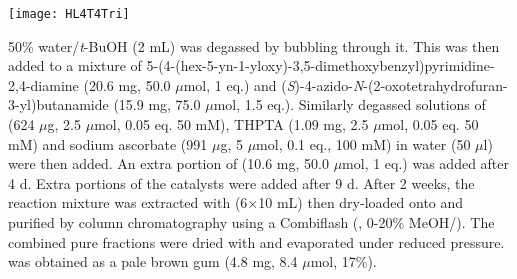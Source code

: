	
\begin{scheme}[H]
	\begin{center}
		\texttt{[image: HL4T4Tri]}
	\end{center}
\end{scheme}
50\% water/\textit{t}-BuOH (2 mL) was degassed by bubbling  through it. This was then added to a mixture of 5-(4-(hex-5-yn-1-yloxy)-3,5-dimethoxybenzyl)pyrimidine-2,4-diamine  (20.6 mg, 50.0 $\mu$mol, 1 eq.) and (\textit{S})-4-azido-\textit{N}-(2-oxotetrahydrofuran-3-yl)butanamide  (15.9 mg, 75.0 $\mu$mol, 1.5 eq.).
Similarly degassed solutions of  (624 $\mu$g, 2.5 $\mu$mol, 0.05 eq. 50 mM), THPTA (1.09 mg, 2.5 $\mu$mol, 0.05 eq. 50 mM) and sodium ascorbate (991 $\mu$g, 5 $\mu$mol, 0.1 eq., 100 mM) in water (50 $\mu$l) were then added. An extra portion of  (10.6 mg, 50.0 $\mu$mol, 1 eq.) was added after 4 d. Extra portions of the catalysts were added after 9 d. 
After 2 weeks, the reaction mixture was extracted with  (6$\times$10 mL) then dry-loaded onto  and purified by column chromatography using a Combiflash (, 0-20\% MeOH/).%
The combined pure fractions were dried with  and evaporated under reduced pressure.
 was obtained as a pale brown gum (4.8 mg, 8.4 $\mu$mol, 17\%).
\\[1\baselineskip]
\\[1\baselineskip]
\\[1\baselineskip]
